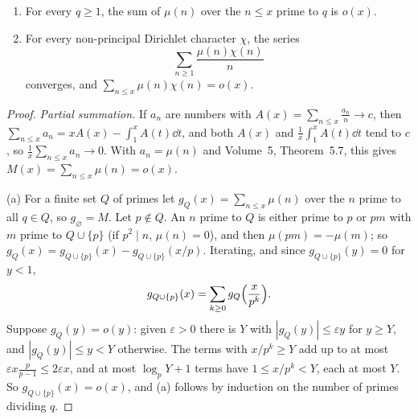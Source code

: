\begin{lemma}\label{conjectures:lem:mobchi}
\begin{enumerate}[label=(\alph*)]
\item For every $q\ge1$, the sum of $\mu(n)$ over the $n\le x$ prime to $q$ is $o(x)$.
\item For every non-principal Dirichlet character $\chi$, the series
\[
\sum_{n\ge1}\frac{\mu(n)\chi(n)}n
\]
converges, and $\sum_{n\le x}\mu(n)\chi(n)=o(x)$.
\end{enumerate}
\end{lemma}
\begin{proof}
\emph{Partial summation.} If $a_n$ are numbers with $A(x)=\sum_{n\le x}\frac{a_n}n\to c$, then $\sum_{n\le x}a_n=xA(x)-\int_1^xA(t)\dd t$, and both $A(x)$ and
$\frac1x\int_1^xA(t)\dd t$ tend to $c$, so $\frac1x\sum_{n\le x}a_n\to0$. With $a_n=\mu(n)$ and Volume~5, Theorem~5.7, this gives $M(x)=\sum_{n\le x}\mu(n)=o(x)$.

(a) For a finite set $Q$ of primes let $g_Q(x)=\sum_{n\le x}\mu(n)$ over the $n$ prime to all $q\in Q$, so $g_\varnothing=M$. Let $p\notin Q$. An $n$ prime to $Q$ is
either prime to $p$ or $pm$ with $m$ prime to $Q\cup\{p\}$ (if $p^2\mid n$, $\mu(n)=0$), and then $\mu(pm)=-\mu(m)$; so $g_Q(x)=g_{Q\cup\{p\}}(x)-g_{Q\cup\{p\}}(x/p)$.
Iterating, and since $g_{Q\cup\{p\}}(y)=0$ for $y<1$,
\[
g_{Q\cup\{p\}}(x)=\sum_{k\ge0}g_Q\Bigl(\frac x{p^k}\Bigr).
\]
Suppose $g_Q(y)=o(y)$: given $\varepsilon>0$ there is $Y$ with $|g_Q(y)|\le\varepsilon y$ for $y\ge Y$, and $|g_Q(y)|\le y<Y$ otherwise. The terms with
$x/p^k\ge Y$ add up to at most $\varepsilon x\frac p{p-1}\le2\varepsilon x$, and at most $\log_pY+1$ terms have $1\le x/p^k<Y$, each at most $Y$. So
$g_{Q\cup\{p\}}(x)=o(x)$, and (a) follows by induction on the number of primes dividing $q$.


\end{proof}
